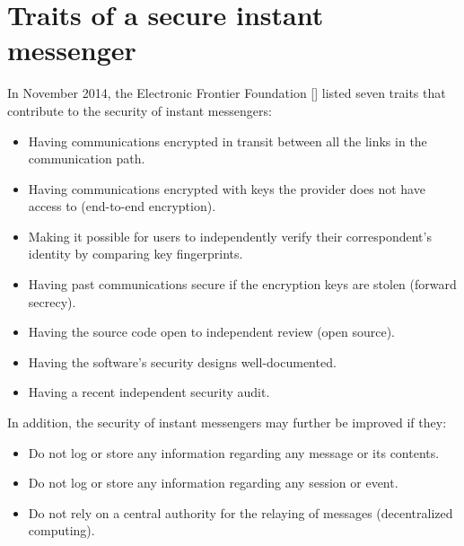 \section{Traits of a secure instant messenger}\label{sec:traits-of-a-secure-instant-messenger}
In November 2014, the Electronic Frontier Foundation [\cite{von2010electronic}] listed seven traits that contribute to
the security of instant messengers:
\begin{itemize}
    \item Having communications encrypted in transit between all the links in the communication path.
    \item Having communications encrypted with keys the provider does not have access to (end-to-end encryption).
    \item Making it possible for users to independently verify their correspondent's identity by comparing key fingerprints.
    \item Having past communications secure if the encryption keys are stolen (forward secrecy).
    \item Having the source code open to independent review (open source).
    \item Having the software's security designs well-documented.
    \item Having a recent independent security audit.
\end{itemize}
In addition, the security of instant messengers may further be improved if they:
\begin{itemize}
    \item Do not log or store any information regarding any message or its contents.
    \item Do not log or store any information regarding any session or event.
    \item Do not rely on a central authority for the relaying of messages (decentralized computing).
\end{itemize}


